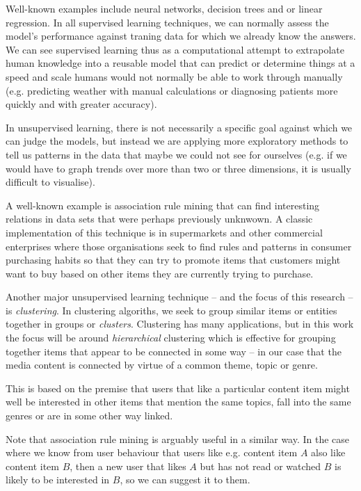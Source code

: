 Well-known examples include neural networks, decision trees and or
linear regression. In all supervised learning techniques, we can
normally assess the model's performance against traning data for
which we already know the answers. We can see supervised learning
thus as a computational attempt to extrapolate human knowledge into
a reusable model that can predict or determine things at a speed
and scale humans would not normally be able to work through manually
(e.g. predicting weather with manual calculations or diagnosing
patients more quickly and with greater accuracy).

In unsupervised learning, there is not necessarily a specific goal
against which we can judge the models, but instead we are applying
more exploratory methods to tell us patterns in the data that maybe
we could not see for ourselves (e.g. if we would have to graph trends
over more than two or three dimensions, it is usually difficult to
visualise).

A well-known example is association rule mining that can find
interesting relations in data sets that were perhaps previously
unknwown. A classic implementation of this technique is in
supermarkets and other commercial enterprises where those
organisations seek to find rules and patterns in consumer purchasing
habits so that they can try to promote items that customers might
want to buy based on other items they are currently trying to
purchase.

Another major unsupervised learning technique -- and the focus of
this research -- is \emph{clustering}. In clustering algoriths, we
seek to group similar items or entities together in groups or
\emph{clusters}. Clustering has many applications, but in this
work the focus will be around \emph{hierarchical} clustering which
is effective for grouping together items that appear to be
connected in some way -- in our case that the media content is
connected by virtue of a common theme, topic or genre.

This is based on the premise that users that like a particular
content item might well be interested in other items that mention
the same topics, fall into the same genres or are in some other
way linked.

Note that association rule mining is arguably useful in a similar way.
In the case where we know from user behaviour that users like e.g.
content item $A$ also like content item $B$, then a new user that
likes $A$ but has not read or watched $B$ is likely to be interested
in $B$, so we can suggest it to them.

